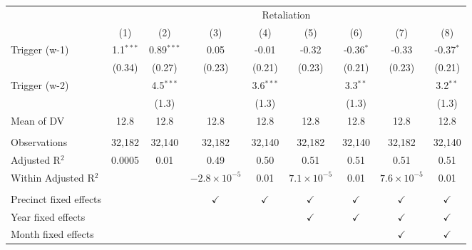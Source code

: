 \begingroup \centering \begin{tabular}{lcccccccc}    \toprule     & \multicolumn{8}{c}{Retaliation}\\                           & (1)         & (2)          & (3)                   & (4)           & (5)                  & (6)           & (7)                  & (8)\\      \midrule     Trigger (w-1)          & 1.1$^{***}$ & 0.89$^{***}$ & 0.05                  & -0.01         & -0.32                & -0.36$^{*}$   & -0.33                & -0.37$^{*}$\\                              & (0.34)      & (0.27)       & (0.23)                & (0.21)        & (0.23)               & (0.21)        & (0.23)               & (0.21)\\       Trigger (w-2)          &             & 4.5$^{***}$  &                       & 3.6$^{***}$   &                      & 3.3$^{**}$    &                      & 3.2$^{**}$\\                              &             & (1.3)        &                       & (1.3)         &                      & (1.3)         &                      & (1.3)\\       Mean of DV             & 12.8        & 12.8         & 12.8                  & 12.8          & 12.8                 & 12.8          & 12.8                 & 12.8\\       \\    Observations           & 32,182      & 32,140       & 32,182                & 32,140        & 32,182               & 32,140        & 32,182               & 32,140\\      Adjusted R$^2$         & 0.0005      & 0.01         & 0.49                  & 0.50          & 0.51                 & 0.51          & 0.51                 & 0.51\\      Within Adjusted R$^2$  &             &              & $-2.8\times 10^{-5}$  & 0.01          & $7.1\times 10^{-5}$  & 0.01          & $7.6\times 10^{-5}$  & 0.01\\       \\    Precinct fixed effects &             &              & $\checkmark$          & $\checkmark$  & $\checkmark$         & $\checkmark$  & $\checkmark$         & $\checkmark$\\       Year fixed effects     &             &              &                       &               & $\checkmark$         & $\checkmark$  & $\checkmark$         & $\checkmark$\\       Month fixed effects    &             &              &                       &               &                      &               & $\checkmark$         & $\checkmark$\\       \bottomrule \end{tabular} \par\endgroup